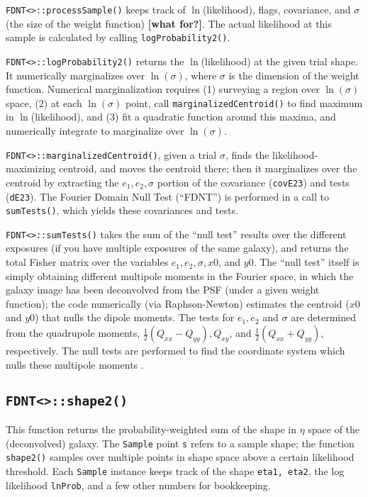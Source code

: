 \documentclass[useAMS,usenatbib,usegraphicx]{mn2e}
\begin{document}
{\tt FDNT<>::processSample()} keeps track of $\ln$(likelihood), flags, covariance, and 
$\sigma$ (the size of the weight function) {\bf [what for?]}.  
The actual likelihood at this sample is calculated by calling {\tt logProbability2()}.

{\tt FDNT<>::logProbability2()} returns the $\ln$(likelihood) at the given trial shape.
It numerically marginalizes over $\ln(\sigma)$, where $\sigma$ is the dimension of the 
weight function.  Numerical marginalization requires (1) surveying a region over 
$\ln(\sigma)$ space, (2) at each $\ln(\sigma)$ point, call {\tt marginalizedCentroid()} to find
maximum in $\ln$(likelihood), and (3) fit a quadratic function around this maxima, and
numerically integrate to marginalize over $\ln(\sigma)$.  

{\tt FDNT<>::marginalizedCentroid()}, given a trial $\sigma$, finds the likelihood-maximizing
centroid, and moves the centroid there; then it marginalizes over the centroid by extracting
the $e_1, e_2, \sigma$ portion of the covariance ({\tt covE23}) and tests ({\tt dE23}).  
The Fourier Domain Null Test (``FDNT'') is performed in a call to {\tt sumTests()}, which 
yields these covariances and tests.

{\tt FDNT<>::sumTests()} takes the sum of the ``null test'' results over the different
exposures (if you have multiple exposures of the same galaxy), and returns the total
Fisher matrix over the variables $e_1, e_2, \sigma, x0$, and $y0$.
The ``null test'' itself is simply obtaining different multipole moments in the 
Fourier space, in which the galaxy image has been deconvolved from the PSF (under a given weight
function); the code numerically (via Raphson-Newton) estimates the centroid ($x0$ and $y0$)
that nulls the dipole moments.  The tests for $e_1, e_2$ and $\sigma$ are determined from the
quadrupole moments, $\frac{1}{2}(Q_{xx}-Q_{yy}), Q_{xy}$, and $\frac{1}{2}(Q_{xx}+Q_{yy})$,
respectively.  The null tests are performed to find the coordinate system which nulls these 
multipole moments \citep{bernstein:2010}.


\subsection{{\tt FDNT<>::shape2()}}
This function returns the probability-weighted sum of the shape in $\eta$ space
of the (deconvolved) galaxy.
The {\tt Sample} point {\tt s} refers to a sample shape; the function {\tt shape2()} 
samples over multiple points in shape space above a certain likelihood threshold.
Each {\tt Sample} instance keeps track of the shape {\tt eta1, eta2}, the 
log likelihood {\tt lnProb}, and a few other numbers for bookkeeping.
\end{document}

